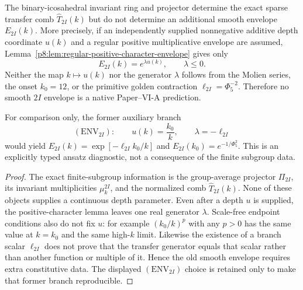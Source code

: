 \documentclass[12pt,a4paper]{article}
\begin{document}
\begin{theorem}
\label{p8:thm:unique-2I-envelope}
The binary-icosahedral invariant ring and projector determine the exact sparse
transfer comb \(\widehat T_{2I}(k)\) but do not determine an additional smooth
envelope \(E_{2I}(k)\).  More precisely, if an independently supplied
nonnegative additive depth coordinate \(u(k)\) and a regular positive
multiplicative envelope are assumed, Lemma~\ref{p8:lem:regular-positive-character-envelope}
gives only
\begin{equation}
\label{p8:eq:2I-envelope-min}
E_{2I}(k)=e^{\lambda u(k)},\qquad \lambda\le0.
\end{equation}
Neither the map \(k\mapsto u(k)\) nor the generator \(\lambda\) follows from
the Molien series, the onset \(k_0=12\), or the primitive golden contraction
\(\ell_{2I}=\Phi_5^{-2}\).  Therefore no smooth \(2I\) envelope is a native
Paper--VI-A prediction.

For comparison only, the former auxiliary branch
\begin{equation}
\label{p8:eq:2I-envelope-pivot}
(\mathrm{ENV}_{2I}):\qquad
u(k)=\frac{k_0}{k},\qquad
\lambda=-\ell_{2I}
\end{equation}
would yield
\(E_{2I}(k)=\exp[-\ell_{2I}k_0/k]\) and
\(E_{2I}(k_0)=e^{-1/\Phi_5^2}\).  This is an explicitly typed ansatz diagnostic,
not a consequence of the finite subgroup data.
\end{theorem}

\begin{proof}
The exact finite-subgroup information is the group-average projector
\(\Pi_{2I}\), its invariant multiplicities \(\mu_k^{2I}\), and the normalized comb
\(\widehat T_{2I}(k)\).  None of these objects supplies a continuous depth
parameter.  Even after a depth \(u\) is supplied, the positive-character
lemma leaves one real generator \(\lambda\).  Scale-free endpoint conditions
also do not fix \(u\): for example \((k_0/k)^p\) with any \(p>0\) has the same
value at \(k=k_0\) and the same high-\(k\) limit.  Likewise the existence of a
branch scalar \(\ell_{2I}\) does not prove that the transfer generator equals
that scalar rather than another function or multiple of it.  Hence the old
smooth envelope requires extra constitutive data.  The displayed
\((\mathrm{ENV}_{2I})\) choice is retained only to make that former branch
reproducible.
\end{proof}
\end{document}
